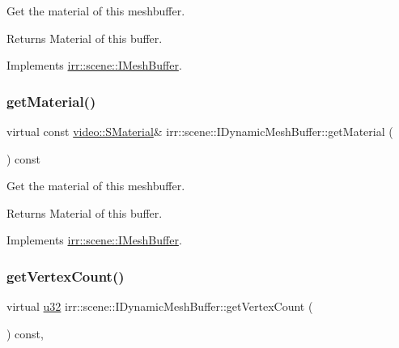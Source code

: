 Get the material of this meshbuffer. 

\begin{DoxyReturn}{Returns}
Material of this buffer. 
\end{DoxyReturn}


Implements \hyperlink{classirr_1_1scene_1_1IMeshBuffer_a26fd922f00fde56abbbbbe40b485238b}{irr\+::scene\+::\+I\+Mesh\+Buffer}.

\mbox{\label{classirr_1_1scene_1_1IDynamicMeshBuffer_a3be83e4819e9f79a3d9b264eb8bf4cfc}} 
\subsubsection{\texorpdfstring{get\+Material()}{getMaterial()}\hspace{0.1cm}{\footnotesize\ttfamily [2/2]}}
{\footnotesize\ttfamily virtual const \hyperlink{classirr_1_1video_1_1SMaterial}{video\+::\+S\+Material}\& irr\+::scene\+::\+I\+Dynamic\+Mesh\+Buffer\+::get\+Material (\begin{DoxyParamCaption}{ }\end{DoxyParamCaption}) const\hspace{0.3cm}{\ttfamily [pure virtual]}}



Get the material of this meshbuffer. 

\begin{DoxyReturn}{Returns}
Material of this buffer. 
\end{DoxyReturn}


Implements \hyperlink{classirr_1_1scene_1_1IMeshBuffer_a341c1da2fd0cd556a15aab06d07dbbaa}{irr\+::scene\+::\+I\+Mesh\+Buffer}.

\mbox{\label{classirr_1_1scene_1_1IDynamicMeshBuffer_afc317a8ccda7e7eceb1f4955c90848d2}} 
\subsubsection{\texorpdfstring{get\+Vertex\+Count()}{getVertexCount()}}
{\footnotesize\ttfamily virtual \hyperlink{namespaceirr_a0416a53257075833e7002efd0a18e804}{u32} irr\+::scene\+::\+I\+Dynamic\+Mesh\+Buffer\+::get\+Vertex\+Count (\begin{DoxyParamCaption}{ }\end{DoxyParamCaption}) const\hspace{0.3cm}{\ttfamily [inline]}, {\ttfamily [virtual]}}



